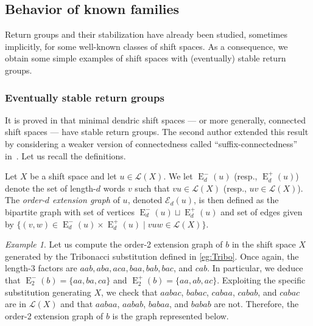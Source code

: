 \documentclass{amsart}
\newcommand*{\lang}{\mathcal{L}}
\newcommand*{\leftExt}[1]{\operatorname{E}^-_{#1}}
\newcommand*{\rightExt}[1]{\operatorname{E}^+_{#1}}
\newcommand*{\ExtGraph}[1]{\mathcal{E}_{#1}}
\theoremstyle{plain}
\theoremstyle{definition}
\theoremstyle{remark}
\newtheorem{example}[theorem]{Example}
\begin{document}
\subsection{Behavior of known families}\label{S:examples}

Return groups and their stabilization have already been studied, sometimes implicitly, for some well-known classes of shift spaces. As a consequence, we obtain some simple examples of shift spaces with (eventually) stable return groups.

\subsubsection{Eventually stable return groups}
It is proved in \cite{Berthe2015} that minimal dendric shift spaces --- or more generally, connected shift spaces --- have stable return groups. The second author extended this result by considering a weaker version of connectedness called ``suffix-connectedness'' in~\cite{Goulet-Ouellet2022}. Let us recall the definitions.

Let $X$ be a shift space and let $u \in \lang(X)$. We let $\leftExt{d}(u)$ (resp., $\rightExt{d}(u)$) denote the set of length-$d$ words $v$ such that $vu \in \lang(X)$ (resp., $uv \in \lang(X)$). The \emph{order-$d$ extension graph} of $u$, denoted $\ExtGraph{d}(u)$, is then defined as the bipartite graph with set of vertices $\leftExt{d}(u) \sqcup \rightExt{d}(u)$ and set of edges given by $\{ (v, w) \in \leftExt{d}(u) \times \rightExt{d}(u) \mid vuw \in \lang(X)\}$.

\begin{example}\label{eg:ExtGraph}
    Let us compute the order-2 extension graph of $b$ in the shift space $X$ generated by the Tribonacci substitution defined in \cref{eg:Tribo}. Once again, the length-$3$ factors are $aab,aba,aca,baa,bab,bac$, and $cab$.
    In particular, we deduce that $\leftExt{2}(b) = \{aa,ba,ca\}$ and $\rightExt{2}(b) = \{aa,ab,ac\}$. Exploiting the specific substitution generating $X$, we check that $aabac$, $babac$, $cabaa$, $cabab$, and $cabac$ are in $\lang(X)$ and that $aabaa$, $aabab$, $babaa$, and $babab$ are not. Therefore, the order-2 extension graph of $b$ is the graph represented below.
    \begin{center}
    \end{center}
\end{example}
\end{document}
